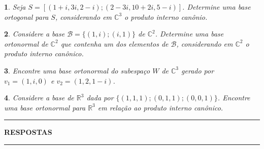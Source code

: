 \documentclass[12pt]{exam}
\newtheorem{exercicio}{}
\newcommand{\real}{\mathbb{R}}
\newcommand{\complex}{\mathbb{C}}
\begin{document}
\begin{exercicio}
  Seja $S = [(1 + i, 3i, 2 - i); (2 - 3i, 10 + 2i, 5 - i)]$. Determine uma base ortogonal para $S$, considerando em $\complex^3$ o produto interno can\^onio.
\end{exercicio}

\begin{exercicio}
  Considere a base $\mathcal{B} = \{(1, i); (i, 1)\}$ de $\complex^2$. Determine uma base ortonormal de $\complex^2$ que contenha um dos elementos de $\mathcal{B}$, considerando em $\complex^2$ o produto interno can\^onico.
\end{exercicio}

\begin{exercicio}
  Encontre uma base ortonormal do subespa\c{c}o $W$ de $\complex^3$ gerado por $v_1 = (1, i, 0)$ e $v_2 = (1, 2, 1 - i)$.
\end{exercicio}

\begin{exercicio}
  Considere a base de $\real^3$ dada por $\{(1, 1, 1); (0, 1, 1); (0, 0, 1)\}$. Encontre uma base ortonormal para $\real^3$ em rela\c{c}\~ao  ao produto interno can\^onico.
\end{exercicio}


\newpage
{}
\hrule
\begin{center}
{\large\bf RESPOSTAS}
\end{center}
\hrule

\end{document}
